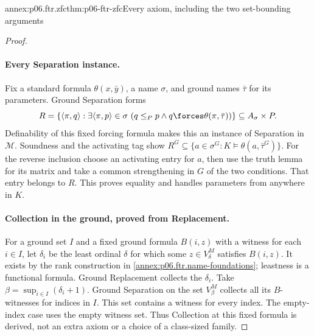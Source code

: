 \begin{annexitem}{annex:p06.ftr.zfc}{thm:p06-ftr-zfc}{Every axiom, including the two set-bounding arguments}
\begin{proof}
\paragraph{Every Separation instance.}
Fix a standard formula \(\theta(x,\bar y)\), a name \(\sigma\), and
ground names \(\bar\tau\) for its parameters. Ground Separation forms
\[
 R=\{\langle\pi,q\rangle:\exists\langle\pi,p\rangle\in\sigma\
       (q\leq_P p\land q\forces\theta(\pi,\bar\tau))\}
       \subseteq A_\sigma\times P.
\]
Definability of this fixed forcing formula makes this an instance of
Separation in \(\mathcal M\). Soundness and the activating tag show
\(R^G\subseteq\{a\in\sigma^G:K\models\theta(a,\bar\tau^G)\}\).
For the reverse inclusion choose an activating entry for \(a\), then
use the truth lemma for its matrix and take a common strengthening in
\(G\) of the two conditions. That entry belongs to \(R\).
This proves equality and handles parameters from anywhere in \(K\).

\paragraph{Collection in the ground, proved from Replacement.}
For a ground set \(I\) and a fixed ground formula \(B(i,z)\) with a
witness for each \(i\in I\), let \(\delta_i\) be the least ordinal
\(\delta\) for which some \(z\in V_\delta^M\) satisfies \(B(i,z)\).
It exists by the rank construction in
\cref{annex:p06.ftr.name-foundations}; leastness is a functional formula.
Ground Replacement collects the \(\delta_i\). Take
\(\beta=\sup_{i\in I}(\delta_i+1)\). Ground Separation on the set
\(V_\beta^M\) collects all its \(B\)-witnesses for indices in \(I\).
This set contains a witness for every index. The empty-index case uses
the empty witness set. Thus Collection at this fixed formula is derived,
not an extra axiom or a choice of a class-sized family.


\end{proof}
\end{annexitem}
